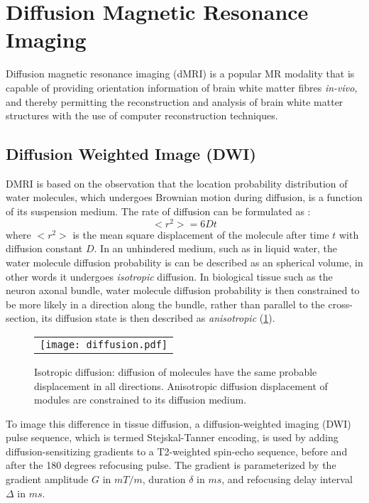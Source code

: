 \section{Diffusion Magnetic Resonance Imaging}

Diffusion magnetic resonance imaging (dMRI) is a popular MR modality that is capable of providing orientation information of brain white matter fibres \textit{in-vivo}, and thereby permitting the reconstruction and analysis of brain white matter structures with the use of computer reconstruction techniques. 

\subsection{Diffusion Weighted Image (DWI)}

DMRI is based on the observation that the location probability distribution of water molecules, which undergoes Brownian motion during diffusion, is a function of its suspension medium. The rate of diffusion can be formulated as \cite{Mukherjee2008}: 
\begin{equation}
<r^2>=6Dt
\end{equation}
where $<r^2>$ is the mean square displacement of the molecule after time $t$ with diffusion constant $D$. In an unhindered medium, such as in liquid water, the water molecule diffusion probability is can be described as an spherical volume, in other words it undergoes \textit{isotropic} diffusion. In biological tissue such as the neuron axonal bundle, water molecule diffusion probability is then constrained to be more likely in a direction along the bundle, rather than parallel to the cross-section, its diffusion state is then described as \textit{anisotropic} (\ref{fig:diffusion}). 

\begin{figure}[ht]
\begin{center}
\begin{tabular}{c}
\texttt{[image: diffusion.pdf]}
\end{tabular}
\caption{Isotropic diffusion: diffusion of molecules have the same probable displacement in all directions. Anisotropic diffusion displacement of modules are constrained to its diffusion medium.}
\label{fig:diffusion}
\end{center}
\end{figure}

To image this difference in tissue diffusion, a diffusion-weighted imaging (DWI) pulse sequence, which is termed Stejskal-Tanner encoding, is used by adding diffusion-sensitizing gradients to a T2-weighted spin-echo sequence, before and after the 180 degrees refocusing pulse. The gradient is parameterized by the gradient amplitude $G$ in $mT/m$, duration $\delta$ in $ms$, and refocusing delay interval $\Delta$ in $ms$. 

